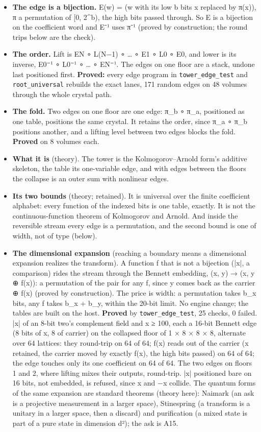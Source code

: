 \begin{itemize}
\item \textbf{The edge is a bijection.} E(w) = (w with its low b bits x replaced by π(x)), π a permutation of [0, 2\textasciicircum{}b), the high bits passed through. So E is a bijection on the coefficient word and E⁻¹ uses π⁻¹ (proved by construction; the round trips below are the check).
\item \textbf{The order.} Lift is EN ∘ L(N−1) ∘ … ∘ E1 ∘ L0 ∘ E0, and lower is its inverse, E0⁻¹ ∘ L0⁻¹ ∘ … ∘ EN⁻¹. The edges on one floor are a stack, undone last positioned first. \textbf{Proved:} every edge program in \texttt{tower\_\allowbreak{}edge\_\allowbreak{}test} and \texttt{root\_\allowbreak{}universal} rebuilds the exact lanes, 171 random edges on 48 volumes through the whole crystal path.
\item \textbf{The fold.} Two edges on one floor are one edge: π\_\allowbreak{}b ∘ π\_\allowbreak{}a, positioned as one table, positions the same crystal. It retains the order, since π\_\allowbreak{}a ∘ π\_\allowbreak{}b positions another, and a lifting level between two edges blocks the fold. \textbf{Proved} on 8 volumes each.
\item \textbf{What it is} (theory). The tower is the Kolmogorov–Arnold form's additive skeleton, the table its one-variable edge, and with edges between the floors the collapse is an outer sum with nonlinear edges.
\item \textbf{Its two bounds} (theory; retained). It is universal over the finite coefficient alphabet: every function of the indexed bits is one table, exactly. It is not the continuous-function theorem of Kolmogorov and Arnold. And inside the reversible stream every edge is a permutation, and the second bound is one of width, not of type (below).
\item \textbf{The dimensional expansion} (reaching a boundary means a dimensional expansion realizes the transform). A function f that is not a bijection (|x|, a comparison) rides the stream through the Bennett embedding, (x, y) → (x, y ⊕ f(x)): a permutation of the pair for any f, since y comes back as the carrier ⊕ f(x) (proved by construction). The price is width: a permutation takes b\_\allowbreak{}x bits, any f takes b\_\allowbreak{}x + b\_\allowbreak{}y, within the 20-bit limit. No engine change; the tables are built on the host. \textbf{Proved} by \texttt{tower\_\allowbreak{}edge\_\allowbreak{}test}, 25 checks, 0 failed. |x| of an 8-bit two's complement field and x ≥ 100, each a 16-bit Bennett edge (8 bits of x, 8 of carrier) on the collapsed floor of 1 × 8 × 8 × 8, alternate over 64 lattices: they round-trip on 64 of 64; f(x) reads out of the carrier (x retained, the carrier moved by exactly f(x), the high bits passed) on 64 of 64; the edge touches only its one coefficient on 64 of 64. The two edges on floors 1 and 2, where lifting mixes their outputs, round-trip. |x| positioned bare on 16 bits, not embedded, is refused, since x and −x collide. The quantum forms of the same expansion are standard theorems (theory here): Naimark (an ask is a projective measurement in a larger space), Stinespring (a transform is a unitary in a larger space, then a discard) and purification (a mixed state is part of a pure state in dimension d²); the ask is A15.

\end{itemize}
